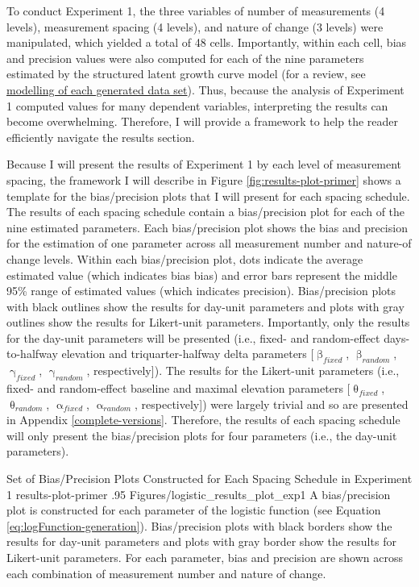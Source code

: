 \documentclass[
12pt, %
twoside,
english]{guelphthesis}
\begin{document}
To conduct Experiment 1, the three variables of number of measurements (4 levels), measurement spacing (4 levels), and nature of change (3 levels) were manipulated, which yielded a total of 48 cells. Importantly, within each cell, bias and precision values were also computed for each of the nine parameters estimated by the structured latent growth curve model (for a review, see \protect\hyperlink{modelling-data-sets}{modelling of each generated data set}). Thus, because the analysis of Experiment 1 computed values for many dependent variables, interpreting the results can become overwhelming. Therefore, I will provide a framework to help the reader efficiently navigate the results section.

Because I will present the results of Experiment 1 by each level of measurement spacing, the framework I will describe in Figure \ref{fig:results-plot-primer} shows a template for the bias/precision plots that I will present for each spacing schedule. The results of each spacing schedule contain a bias/precision plot for each of the nine estimated parameters. Each bias/precision plot shows the bias and precision for the estimation of one parameter across all measurement number and nature-of change levels. Within each bias/precision plot, dots indicate the average estimated value (which indicates bias bias) and error bars represent the middle 95\% range of estimated values (which indicates precision). Bias/precision plots with black outlines show the results for day-unit parameters and plots with gray outlines show the results for Likert-unit parameters. Importantly, only the results for the day-unit parameters will be presented (i.e., fixed- and random-effect days-to-halfway elevation and triquarter-halfway delta parameters {[}\(\upbeta_{fixed}\), \(\upbeta_{random}\), \(\upgamma_{fixed}\), \(\upgamma_{random}\), respectively{]}). The results for the Likert-unit parameters (i.e., fixed- and random-effect baseline and maximal elevation parameters {[}\(\uptheta_{fixed}\), \(\uptheta_{random}\), \(\upalpha_{fixed}\), \(\upalpha_{random}\), respectively{]}) were largely trivial and so are presented in Appendix \ref{complete-versions}. Therefore, the results of each spacing schedule will only present the bias/precision plots for four parameters (i.e., the day-unit parameters).
\begin{apaFigure}
[portrait]
[samepage]
[-0.2cm]
{Set of Bias/Precision Plots Constructed for Each Spacing Schedule in Experiment 1}
{results-plot-primer}
{.95}
{Figures/logistic_results_plot_exp1}
{A bias/precision plot is constructed for each parameter of the logistic function (see Equation \ref{eq:logFunction-generation}). Bias/precision plots with black borders show the results for day-unit parameters and plots with gray border show the results for Likert-unit parameters. For each parameter, bias and precision are shown across each combination of measurement number and nature of change.}\end{apaFigure}
\end{document}
